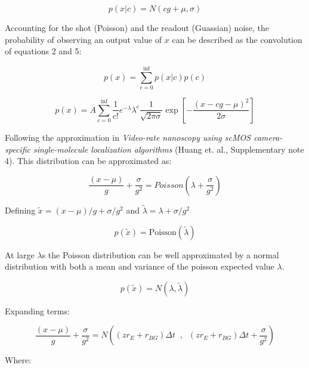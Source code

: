 \begin{equation}
	p(x | c) = N( c g + \mu, \sigma)
\end{equation}

Accounting for the shot (Poisson) and the readout (Guassian) noise, the probability of observing an output value of $x$ can be described as the convolution of equations 2 and 5:

\begin{equation}
	p(x) = \sum_{c=0}^{\inf} p(x | c)p(c)
\end{equation}

\begin{equation*}
	p(x) = A \sum_{c=0}^{\inf} \frac{1}{c!} e^{-\lambda} \lambda^{c} 
	\frac{1}{\sqrt{2\pi \sigma} } \exp{ \left[
	- \frac{(x - cg - \mu)^{2}}{2 \sigma} \right]}
\end{equation*}


Following the approximation in \textit{Video-rate nanoscopy using scMOS camera-specific single-molecule localization algorithms} (Huang et. al., Supplementary note 4). This distribution can be approximated as:

\begin{equation}
	\frac{(x - \mu)}{g} + \frac{\sigma}{g^{2}} = Poisson \left(\lambda + \frac{\sigma}{g^{2}} \right)
\end{equation}

Defining $\tilde{x} = (x - \mu)/g + \sigma/g^{2}$ and $\tilde{\lambda} = \lambda +  \sigma/g^{2}$

\begin{equation}
	p(\tilde{x}) = \text{Poisson}\left(\tilde{\lambda} \right)
\end{equation}

At large $\lambda$s the Poisson distribution can be well approximated by a normal distribution with both a mean and variance of the poisson expected value $\lambda$.

\begin{equation}
	p(\tilde{x}) = N \left( \lambda, \tilde{\lambda} \right)
\end{equation}

Expanding terms:

\begin{equation}
	\frac{(x - \mu)}{g} + \frac{\sigma}{g^{2}}  = N\left((z r_{E} + r_{BG})\Delta t\;\;,\;\; (z r_{E} + r_{BG})\Delta t + \frac{\sigma}{g^{2}}\right)
\end{equation}

\bigskip
Where:

